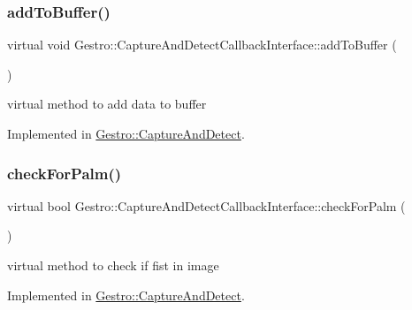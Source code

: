 \subsubsection{\texorpdfstring{add\+To\+Buffer()}{addToBuffer()}}
{\footnotesize\ttfamily virtual void Gestro\+::\+Capture\+And\+Detect\+Callback\+Interface\+::add\+To\+Buffer (\begin{DoxyParamCaption}\item[{\hyperlink{classGestureDetection_1_1FingerAndCoordinates}{Finger\+And\+Coordinates}}]{ }\end{DoxyParamCaption})\hspace{0.3cm}{\ttfamily [pure virtual]}}



virtual method to add data to buffer 



Implemented in \hyperlink{classGestro_1_1CaptureAndDetect_af376ab5418f7b235ee181d574da71fd6}{Gestro\+::\+Capture\+And\+Detect}.

\mbox{\label{classGestro_1_1CaptureAndDetectCallbackInterface_a38fd706c69e3e6839b7328d88f09d7c1}} 
\subsubsection{\texorpdfstring{check\+For\+Palm()}{checkForPalm()}}
{\footnotesize\ttfamily virtual bool Gestro\+::\+Capture\+And\+Detect\+Callback\+Interface\+::check\+For\+Palm (\begin{DoxyParamCaption}{ }\end{DoxyParamCaption})\hspace{0.3cm}{\ttfamily [pure virtual]}}



virtual method to check if fist in image 



Implemented in \hyperlink{classGestro_1_1CaptureAndDetect_a1620075ba1bf4d52a4e455c20f7ac3d1}{Gestro\+::\+Capture\+And\+Detect}.

\mbox{\label{classGestro_1_1CaptureAndDetectCallbackInterface_a9a42d0f1b3fd64cea607eeb4e6a46287}} 

